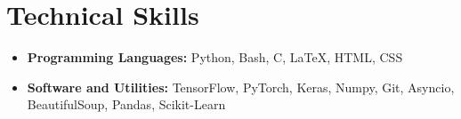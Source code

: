 \section*{Technical Skills}
\begin{itemize}

\setlength\itemsep{0pt}
\item \textbf{Programming Languages:} Python, Bash, C, \LaTeX, HTML, CSS
\item \textbf{Software and Utilities:} TensorFlow, PyTorch, Keras, Numpy, Git, Asyncio, BeautifulSoup, Pandas, Scikit-Learn

\end{itemize}
